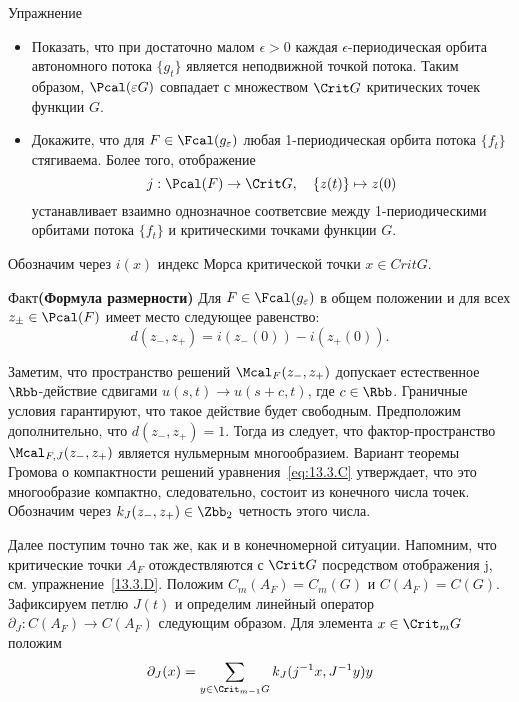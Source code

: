 \begin{ex}{Упражнение}\label{13.3.D}
  \begin{itemize}
  \item
    Показать, что при достаточно малом $\epsilon > 0$ каждая
    $\epsilon$-пе\-ри\-оди\-чес\-кая орбита автономного потока $\{g_{t}\}$
    является неподвижной точкой потока. Таким образом, $\Pcal(\epsilon
    G)$ совпадает с множеством $\Crit G$ критических точек функции $G$.
  \item
    Докажите, что для $F\in\Fcal(g_{\epsilon})$ любая 1-периодическая
    орбита потока $\{f_{t}\}$ стягиваема. 
    Более того, отображение
    \[
    j : \Pcal(F)\to\Crit G,
    \quad
    \{z(t)\}\mapsto z(0)
    \]
    устанавливает взаимно однозначное соответсвие между
    1-пе\-ри\-оди\-чес\-ки\-ми орбитами потока $\{f_{t}\}$ и критическими
    точками функции $G$.
  \end{itemize}
\end{ex}

Обозначим через $i(x)$ индекс Морса критической точки $x\in Crit G$.
\begin{thm}{Факт}\label{13.3.E}\textbf{(Формула размерности)}
  Для $F\in\Fcal(g_{\epsilon})$ в общем положении и для всех
  $z_{\pm}\in\Pcal(F)$ имеет место следующее равенство:
  \[
  d(z_{-}, z_{+}) = i(z_{-}(0)) - i(z_{+}(0)).
  \]
\end{thm}

Заметим, что пространство решений $\Mcal_{F}(z_{-},z_{+})$ допускает
естественное $\Rbb$-действие сдвигами $u(s, t)\to u(s+c, t)$, где
$c\in\Rbb$.
Граничные условия гарантируют, что такое действие будет свободным.
Предположим дополнительно, что $d(z_{-}, z_{+}) = 1$.
Тогда из  следует, что
фактор-пространство $\Mcal_{F,J}(z_{-},z_{+})$ является нульмерным
многообразием.
Вариант теоремы Громова о компактности решений
уравнения~\ref{eq:13.3.C} утверждает, что это многообразие компактно,
следовательно, состоит из конечного числа точек.
Обозначим через $k_{J}(z_{-},z_{+})\in\Zbb_{2}$ четность этого числа.

Далее поступим точно так же, как и в конечномерной ситуации.
Напомним, что критические точки $A_{F}$ отождествляются с $\Crit G$ посредством отображения j, см. упражнение~\ref{13.3.D}.
Положим $C_{m}(A_{F}) = C_{m}(G)$ и $C(A_{F}) = C(G)$.
Зафиксируем петлю $J(t)$ и определим линейный оператор
$\partial_{J}:C(A_{F})\to C(A_{F})$ следующим образом.
Для элемента $x\in\Crit_{m} G$ положим
\[
\partial_{J}(x)=\sum_{y\in\Crit_{m-1}G}k_{J}(j^{-1}x,J^{-1}y)y
\]


